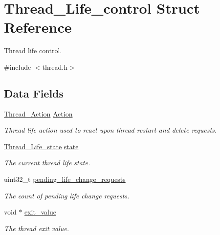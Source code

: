 \hypertarget{structThread__Life__control}{}\section{Thread\+\_\+\+Life\+\_\+control Struct Reference}
\label{structThread__Life__control}


Thread life control.  




{\ttfamily \#include $<$thread.\+h$>$}

\subsection*{Data Fields}
\begin{DoxyCompactItemize}
\item 
\mbox{\label{structThread__Life__control_a428f268ef429072430e4f364be6dad3b}} 
\mbox{\hyperlink{structThread__Action}{Thread\+\_\+\+Action}} \mbox{\hyperlink{structThread__Life__control_a428f268ef429072430e4f364be6dad3b}{Action}}
\begin{DoxyCompactList}\small\item\em Thread life action used to react upon thread restart and delete requests. \end{DoxyCompactList}\item 
\mbox{\label{structThread__Life__control_a4a34d8558039670d699ac6605f0079e4}} 
\mbox{\hyperlink{group__RTEMSScoreThread_ga0b4c61e432a0c21855e3122bb394583d}{Thread\+\_\+\+Life\+\_\+state}} \mbox{\hyperlink{structThread__Life__control_a4a34d8558039670d699ac6605f0079e4}{state}}
\begin{DoxyCompactList}\small\item\em The current thread life state. \end{DoxyCompactList}\item 
\mbox{\label{structThread__Life__control_a3e3863e20f935cc7afac47ef99942d8b}} 
uint32\+\_\+t \mbox{\hyperlink{structThread__Life__control_a3e3863e20f935cc7afac47ef99942d8b}{pending\+\_\+life\+\_\+change\+\_\+requests}}
\begin{DoxyCompactList}\small\item\em The count of pending life change requests. \end{DoxyCompactList}\item 
void $\ast$ \mbox{\hyperlink{structThread__Life__control_aeca7bfde1f39da333d910c7c26a50224}{exit\+\_\+value}}
\begin{DoxyCompactList}\small\item\em The thread exit value. \end{DoxyCompactList}\end{DoxyCompactItemize}


